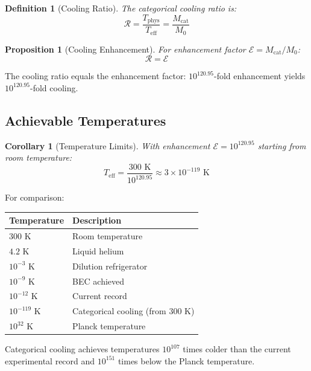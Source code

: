 \documentclass[twocolumn,10pt,twoside]{article}
\newtheorem{proposition}[theorem]{Proposition}
\newtheorem{corollary}[theorem]{Corollary}
\newtheorem{definition}[theorem]{Definition}
\newcommand{\Enh}{\mathcal{E}}
\newcommand{\Teff}{T_{\mathrm{eff}}}
\newcommand{\Tphys}{T_{\mathrm{phys}}}
\newcommand{\Mcat}{M_{\mathrm{cat}}}
\begin{document}
\begin{definition}[Cooling Ratio]
The categorical cooling ratio is:
\begin{equation}
\mathcal{R} = \frac{\Tphys}{\Teff} = \frac{\Mcat}{M_0}
\end{equation}
\end{definition}

\begin{proposition}[Cooling Enhancement]
For enhancement factor $\Enh = \Mcat/M_0$:
\begin{equation}
\mathcal{R} = \Enh
\end{equation}
\end{proposition}

The cooling ratio equals the enhancement factor: $10^{120.95}$-fold enhancement yields $10^{120.95}$-fold cooling.

\subsection{Achievable Temperatures}

\begin{corollary}[Temperature Limits]
\label{cor:temp_limits}
With enhancement $\Enh = 10^{120.95}$ starting from room temperature:
\begin{equation}
\Teff = \frac{300 \text{ K}}{10^{120.95}} \approx 3 \times 10^{-119} \text{ K}
\end{equation}
\end{corollary}

For comparison:
\begin{center}
\begin{tabular}{ll}
\toprule
Temperature & Description \\
\midrule
$300$ K & Room temperature \\
$4.2$ K & Liquid helium \\
$10^{-3}$ K & Dilution refrigerator \\
$10^{-9}$ K & BEC achieved \\
$10^{-12}$ K & Current record \\
$10^{-119}$ K & Categorical cooling (from 300 K) \\
$10^{32}$ K & Planck temperature \\
\bottomrule
\end{tabular}
\end{center}

Categorical cooling achieves temperatures $10^{107}$ times colder than the current experimental record and $10^{151}$ times below the Planck temperature.
\end{document}

